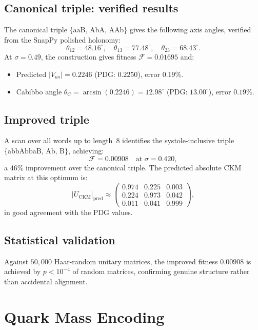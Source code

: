 \documentclass[11pt,a4paper]{article}
\theoremstyle{definition}
\theoremstyle{remark}
\begin{document}
\subsection{Canonical triple: verified results}

The canonical triple $\{\mathrm{aaB},\,\mathrm{AbA},\,\mathrm{AAb}\}$
gives the following axis angles, verified from the SnapPy polished
holonomy:
\[
  \theta_{12} = 48.16^\circ,\quad
  \theta_{13} = 77.48^\circ,\quad
  \theta_{23} = 68.43^\circ.
\]
At $\sigma=0.49$, the construction gives fitness
$\mathcal{F}=0.01695$ and:
\begin{itemize}
\item Predicted $|V_{us}| = 0.2246$ (PDG: $0.2250$), error $0.19\%$.
\item Cabibbo angle $\theta_C = \arcsin(0.2246) = 12.98^\circ$
  (PDG: $13.00^\circ$), error $0.19\%$.
\end{itemize}

\subsection{Improved triple}

A scan over all words up to length~8 identifies the systole-inclusive
triple $\{\mathrm{abbAbbaB},\,\mathrm{Ab},\,\mathrm{B}\}$, achieving:
\[
  \mathcal{F} = 0.00908 \quad \text{at } \sigma = 0.420,
\]
a $46\%$ improvement over the canonical triple.
The predicted absolute CKM matrix at this optimum is:
\[
  |U_{\mathrm{CKM}}|_{\mathrm{pred}} \approx
  \begin{pmatrix}
    0.974 & 0.225 & 0.003 \\
    0.224 & 0.973 & 0.042 \\
    0.011 & 0.041 & 0.999
  \end{pmatrix},
\]
in good agreement with the PDG values.

\subsection{Statistical validation}

Against $50{,}000$ Haar-random unitary matrices, the improved fitness
$0.00908$ is achieved by $p < 10^{-4}$ of random matrices, confirming
genuine structure rather than accidental alignment.

\section{Quark Mass Encoding}
\label{sec:masses}
\end{document}
